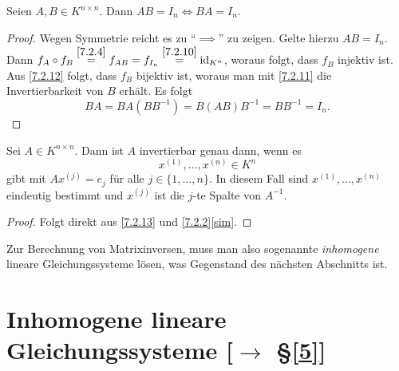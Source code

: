 \documentclass[../../main.tex]{subfiles}
\begin{document}
\begin{sat}\label{7.2.13}
Seien $A,B\in K^{n\times n}$. Dann $AB=I_n\iff BA=I_n$.
\end{sat}

\begin{proof}
Wegen Symmetrie reicht es zu "`$\implies$"' zu zeigen. Gelte hierzu $AB=I_n$. Dann $f_A\circ f_B\overset{\ref{7.2.4}}=f_{AB}=f_{I_n}\overset{\ref{7.2.10}}=\operatorname{id}_{K^n}$, woraus folgt,
dass $f_B$ injektiv ist. Aus \ref{7.2.12} folgt, dass $f_B$ bijektiv ist, woraus man mit \ref{7.2.11} die Invertierbarkeit von $B$ erhält. Es folgt
$$BA=BA(BB^{-1})=B(AB)B^{-1}=BB^{-1}=I_n.$$
\end{proof}

\begin{kor}\label{7.2.14}
Sei $A\in K^{n\times n}$. Dann ist $A$ invertierbar genau dann, wenn es \[x^{(1)},\dots,x^{(n)}\in K^n\] gibt mit $Ax^{(j)}=e_j$ für alle $j\in\{1,\dots,n\}$. In diesem Fall
sind $x^{(1)},\dots,x^{(n)}$ eindeutig bestimmt und $x^{(j)}$ ist die $j$-te Spalte von $A^{-1}$.
\end{kor}

\begin{proof}
Folgt direkt aus \ref{7.2.13} und \ref{7.2.2}\eqref{sim}.
\end{proof}

\noindent
Zur Berechnung von Matrixinversen, muss man also sogenannte \emph{inhomogene} lineare Gleichungssysteme lösen, was Gegenstand des nächsten Abschnitts ist.


\section[tocentry={Inhomogene lineare Gleichungssysteme}]{Inhomogene lineare Gleichungssysteme {\small [$\to$ §\ref{5}]}}\label{7.3}
\end{document}
